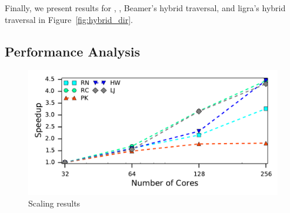 \hybridresults
Finally, we present results for \push, \pull, Beamer's hybrid traversal, and ligra's hybrid traversal in Figure~\ref{fig:hybrid_dir}.
 
\subsection{Performance Analysis}


\begin{figure}[h]
    \centering
    \includegraphics[scale = 0.6]{graphit-figures/hb-scaling-speedup.pdf}
    \caption{Scaling results } %
    \label{pap:generals:sec:eval:fig:scaling}
\end{figure}

\hbBlockingEvalTab

